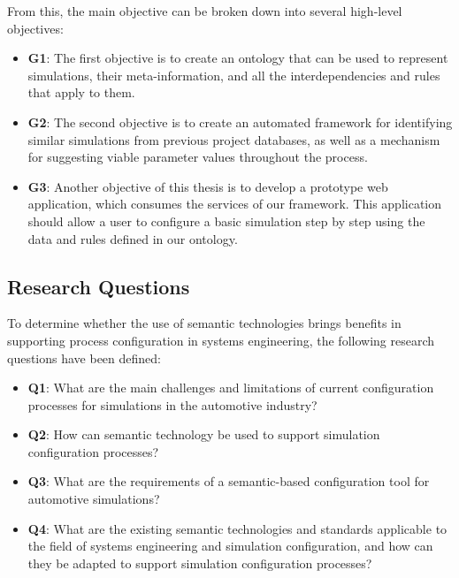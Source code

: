 From this, the main objective can be broken down into several high-level objectives:

\begin{itemize}
  \item \textbf{G1\label{G1}}: The first objective is to create an ontology that can be used to represent simulations, their meta-information, and all the interdependencies and rules that apply to them.

    \item \textbf{G2\label{G2}}: The second objective is to create an automated framework for identifying similar simulations from previous project databases, as well as a mechanism for suggesting viable parameter values throughout the process.
    
    \item \textbf{G3\label{G3}}: Another objective of this thesis is to develop a prototype web application, which consumes the services of our framework. This application should allow a user to configure a basic simulation step by step using the data and rules defined in our ontology.

\end{itemize}


\subsection{Research Questions\label{subsec:reseques}}

To determine whether the use of semantic technologies brings benefits in supporting process configuration in systems engineering, the following research questions have been defined: 

\begin{itemize}
    \item \textbf{Q1\label{Q1}}: What are the main challenges and limitations of current configuration processes for simulations in the automotive industry?
    \item \textbf{Q2\label{Q2}}: How can semantic technology be used to support simulation configuration processes?
    \item \textbf{Q3\label{Q3}}: What are the requirements of a semantic-based configuration tool for automotive simulations?
    \item \textbf{Q4\label{Q4}}: What are the existing semantic technologies and standards applicable to the field of systems engineering and simulation configuration, and how can they be adapted to support simulation configuration processes?
 \end{itemize}


